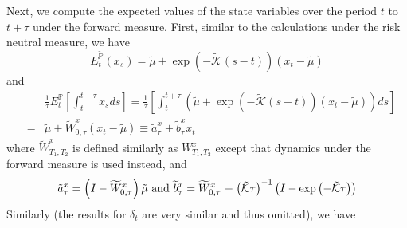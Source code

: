 \documentclass{article}
\begin{document}
Next, we compute the expected values of the state variables over the period $%
t$ to $t+\tau $ under the forward measure. First, similar to the
calculations under the risk neutral measure, we have%
\begin{equation*}
E_{t}^{\mathbb{\tilde{P}}}\left( x_{s}\right) =\tilde{\mu}+\exp \left( -%
\mathcal{\tilde{K}}\left( s-t\right) \right) \left( x_{t}-\tilde{\mu}\right)
\end{equation*}%
and%
\begin{eqnarray*}
&&\frac{1}{\tau }E_{t}^{\mathbb{\tilde{P}}}\left[ \int_{t}^{t+\tau }x_{s}ds%
\right] =\frac{1}{\tau }\left[ \int_{t}^{t+\tau }\left( \tilde{\mu}+\exp
\left( -\mathcal{\tilde{K}}\left( s-t\right) \right) \left( x_{t}-\tilde{\mu}%
\right) \right) ds\right] \\
&=&\tilde{\mu}+\widetilde{W}_{0,\tau }^{x}\left( x_{t}-\tilde{\mu}\right)
\equiv \tilde{a}_{\tau }^{x}+\tilde{b}_{\tau }^{x}x_{t}
\end{eqnarray*}%
where $\widetilde{W}_{T_{1},T_{2}}^{x}$ is defined similarly as $%
W_{T_{1},T_{2}}^{x}$ except that dynamics under the forward measure is used
instead, and 
\begin{equation*}
\tilde{a}_{\tau }^{x}=\left( I-\widetilde{W}_{0,\tau }^{x}\right) \tilde{\mu}%
\text{ and }\widetilde{b}_{\tau }^{x}=\widetilde{W}_{0,\tau }^{x}\equiv
\left( \mathcal{\tilde{K}}\tau \right) ^{-1}\left( I-\exp \left( -\mathcal{%
\tilde{K}}\tau \right) \right)
\end{equation*}%
Similarly (the results for $\delta _{t}$ are very similar and thus omitted),
we have
\end{document}
